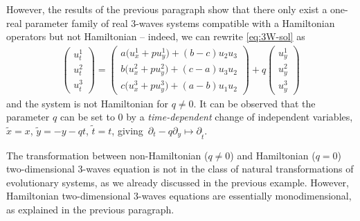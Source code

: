 \documentclass[10pt,a4paper]{amsart}
\numberwithin{equation}{section}
\begin{document}
However, the results of the previous paragraph show that there only exist a one-real parameter family of real 3-waves systems compatible with a Hamiltonian operators but not Hamiltonian -- indeed, we can rewrite \eqref{eq:3W-sol} as
\begin{gather*}
\begin{pmatrix}u^1_t\\[1mm] u^2_t\\[1mm] u^3_t\end{pmatrix}=\begin{pmatrix}a\big(u^1_x+p u^1_y\big)+(b-c)u_2u_3\\[1mm] b\big(u^2_x+p u^2_y\big)+(c-a)u_3u_2\\[1mm] c\big(u^3_x+p u^3_y\big)+(a-b)u_1u_2\end{pmatrix}+q\begin{pmatrix} u^1_y\\[1mm] u^2_y\\[1mm] u^3_y\end{pmatrix}
\end{gather*}
and the system is not Hamiltonian for $q\neq0$. It can be observed that the parameter $q$ can be set to 0 by a \emph{time-dependent} change of independent variables, $\tilde{x}=x$, $\tilde{y}=-y-qt$, $\tilde{t}=t$, giving~${\partial_t-q\partial_y\mapsto\partial_{\tilde{t}}}$.

The transformation between non-Hamiltonian ($q\neq 0$) and Hamiltonian ($q=0$) two-dimen\-sion\-al 3-waves equation is not in the class of natural transformations of evolutionary systems, as we already discussed in the previous example. However, Hamiltonian two-dimensional 3-waves equations are essentially monodimensional, as explained in the previous paragraph.
\end{document}

